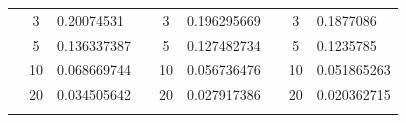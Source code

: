 \begin{table}[h]
\begin{tabular}{|cclcclccl|}
\rowcolor[HTML]{DAE8FC} 
\multicolumn{1}{|c|}{\cellcolor[HTML]{FFFFC7}}                                & \multicolumn{1}{c|}{\cellcolor[HTML]{DAE8FC}3}         & \multicolumn{1}{l|}{\cellcolor[HTML]{DAE8FC}0.20074531}  & \multicolumn{1}{c|}{\cellcolor[HTML]{FFFFC7}}                                & \multicolumn{1}{c|}{\cellcolor[HTML]{DAE8FC}3}         & \multicolumn{1}{l|}{\cellcolor[HTML]{DAE8FC}0.196295669} & \multicolumn{1}{c|}{\cellcolor[HTML]{FFFFC7}}                                & \multicolumn{1}{c|}{\cellcolor[HTML]{DAE8FC}3}         & 0.1877086   \\ \cline{2-3} \cline{5-6} \cline{8-9} 
\rowcolor[HTML]{DDFDFF} 
\multicolumn{1}{|c|}{\cellcolor[HTML]{FFFFC7}}                                & \multicolumn{1}{c|}{\cellcolor[HTML]{DDFDFF}5}         & \multicolumn{1}{l|}{\cellcolor[HTML]{DDFDFF}0.136337387} & \multicolumn{1}{c|}{\cellcolor[HTML]{FFFFC7}}                                & \multicolumn{1}{c|}{\cellcolor[HTML]{DDFDFF}5}         & \multicolumn{1}{l|}{\cellcolor[HTML]{DDFDFF}0.127482734} & \multicolumn{1}{c|}{\cellcolor[HTML]{FFFFC7}}                                & \multicolumn{1}{c|}{\cellcolor[HTML]{DDFDFF}5}         & 0.1235785   \\ \cline{2-3} \cline{5-6} \cline{8-9} 
\rowcolor[HTML]{DAE8FC} 
\multicolumn{1}{|c|}{\cellcolor[HTML]{FFFFC7}}                                & \multicolumn{1}{c|}{\cellcolor[HTML]{DAE8FC}10}        & \multicolumn{1}{l|}{\cellcolor[HTML]{DAE8FC}0.068669744} & \multicolumn{1}{c|}{\cellcolor[HTML]{FFFFC7}}                                & \multicolumn{1}{c|}{\cellcolor[HTML]{DAE8FC}10}        & \multicolumn{1}{l|}{\cellcolor[HTML]{DAE8FC}0.056736476} & \multicolumn{1}{c|}{\cellcolor[HTML]{FFFFC7}}                                & \multicolumn{1}{c|}{\cellcolor[HTML]{DAE8FC}10}        & 0.051865263 \\ \cline{2-3} \cline{5-6} \cline{8-9} 
\rowcolor[HTML]{DDFDFF} 
\multicolumn{1}{|c|}{\cellcolor[HTML]{FFFFC7}}                                & \multicolumn{1}{c|}{\cellcolor[HTML]{DDFDFF}20}        & \multicolumn{1}{l|}{\cellcolor[HTML]{DDFDFF}0.034505642} & \multicolumn{1}{c|}{\cellcolor[HTML]{FFFFC7}}                                & \multicolumn{1}{c|}{\cellcolor[HTML]{DDFDFF}20}        & \multicolumn{1}{l|}{\cellcolor[HTML]{DDFDFF}0.027917386} & \multicolumn{1}{c|}{\cellcolor[HTML]{FFFFC7}}                                & \multicolumn{1}{c|}{\cellcolor[HTML]{DDFDFF}20}        & 0.020362715 \\ \cline{2-3} \cline{5-6} \cline{8-9} 
\rowcolor[HTML]{DAE8FC} 

\end{tabular}
\end{table}
